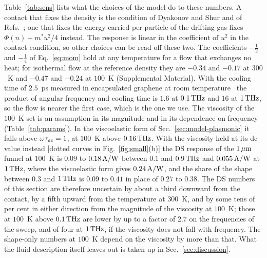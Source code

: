 Table~\ref{tab:sens} lists what the choices of the model do to these
numbers. A contact that fixes the density is the condition of Dyakonov
and Shur and of
Refs.~\cite{tomadin2013theory,svintsov2013hydrodynamic}; one that fixes
the energy carried per particle of the drifting gas fixes
$\Phi(n)+m^{*}u^{2}/4$ instead. The response is linear in the coefficient
of $u^{2}$ in the contact condition, so other choices can be read off
these two. The coefficients $-\tfrac12$ and $-\tfrac14$ of
Eq.~\eqref{eq:mom} hold at any temperature for a flow that exchanges no
heat; for isothermal flow at the reference density they are $-0.34$ and
$-0.17$ at $300$~K and $-0.47$ and $-0.24$ at $100$~K (Supplemental
Material). With the cooling time of $2.5$~ps measured in encapsulated
graphene at room temperature~\cite{tielrooij2018out} the product of
angular frequency and cooling time is $1.6$ at $0.1\,\mathrm{THz}$ and $16$ at
$1\,\mathrm{THz}$, so the flow is nearer the first case, which is the one we use.
The viscosity of the $100$~K set is an assumption in its magnitude and
in its dependence on frequency (Table~\ref{tab:params}). In the
viscoelastic form of Sec.~\ref{sec:model-plasmonic} it falls above
$\omega\tau_{ee}=1$, at $100$~K above $0.16\,\mathrm{THz}$. With the viscosity held
at its dc value instead [dotted curves in Fig.~\ref{fig:small}(b)] the
DS response of the $1\,\mu\mathrm{m}$ funnel at $100$~K is $0.09$ to $0.18\,\mathrm{A/W}$
between $0.1$ and $0.9\,\mathrm{THz}$ and $0.055\,\mathrm{A/W}$ at $1\,\mathrm{THz}$, where the
viscoelastic form gives $0.24\,\mathrm{A/W}$, and the share of the shape between
$0.3$ and $1\,\mathrm{THz}$ is $0.09$ to $0.41$ in place of $0.27$ to $0.38$. The
DS numbers of this section are therefore uncertain by about a third
downward from the contact, by a fifth upward from the temperature at
$300$~K, and by some tens of per cent in either direction from the
magnitude of the viscosity at $100$~K; those at $100$~K above $0.1\,\mathrm{THz}$
are lower by up to a factor of $2.7$ on the frequencies of the sweep, and
of four at $1\,\mathrm{THz}$, if the viscosity does not fall with frequency. The
shape-only numbers at $100$~K depend on the viscosity by more than that.
What the fluid description itself leaves out is taken up in
Sec.~\ref{sec:discussion}.


